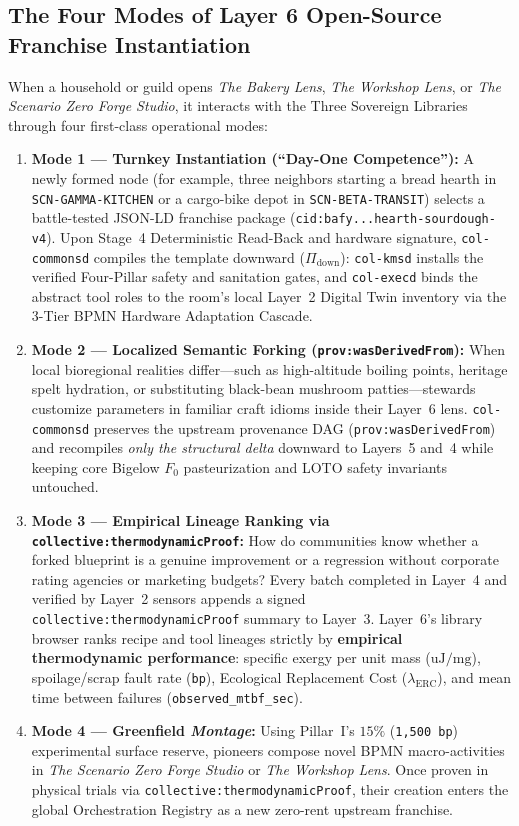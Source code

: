 \subsection{The Four Modes of Layer 6 Open-Source Franchise Instantiation}

When a household or guild opens \textit{The Bakery Lens}, \textit{The Workshop Lens}, or \textit{The Scenario Zero Forge Studio}, it interacts with the Three Sovereign Libraries through four first-class operational modes:
\begin{enumerate}
    \item \textbf{Mode 1 --- Turnkey Instantiation (``Day-One Competence''):} A newly formed node (for example, three neighbors starting a bread hearth in \texttt{SCN-GAMMA-KITCHEN} or a cargo-bike depot in \texttt{SCN-BETA-TRANSIT}) selects a battle-tested JSON-LD franchise package (\texttt{cid:bafy...hearth-sourdough-v4}). Upon Stage~4 Deterministic Read-Back and hardware signature, \texttt{col-commonsd} compiles the template downward ($\Pi_{\mathrm{down}}$): \texttt{col-kmsd} installs the verified Four-Pillar safety and sanitation gates, and \texttt{col-execd} binds the abstract tool roles to the room's local Layer~2 Digital Twin inventory via the 3-Tier BPMN Hardware Adaptation Cascade.
    \item \textbf{Mode 2 --- Localized Semantic Forking (\texttt{prov:wasDerivedFrom}):} When local bioregional realities differ---such as high-altitude boiling points, heritage spelt hydration, or substituting black-bean mushroom patties---stewards customize parameters in familiar craft idioms inside their Layer~6 lens. \texttt{col-commonsd} preserves the upstream provenance DAG (\texttt{prov:wasDerivedFrom}) and recompiles \emph{only the structural delta} downward to Layers~5 and~4 while keeping core Bigelow $F_0$ pasteurization and LOTO safety invariants untouched.
    \item \textbf{Mode 3 --- Empirical Lineage Ranking via \texttt{collective:thermodynamicProof}:} How do communities know whether a forked blueprint is a genuine improvement or a regression without corporate rating agencies or marketing budgets? Every batch completed in Layer~4 and verified by Layer~2 sensors appends a signed \texttt{collective:thermodynamicProof} summary to Layer~3. Layer~6's library browser ranks recipe and tool lineages strictly by \textbf{empirical thermodynamic performance}: specific exergy per unit mass ($\mathrm{uJ/mg}$), spoilage/scrap fault rate (\texttt{bp}), Ecological Replacement Cost ($\lambda_{\mathrm{ERC}}$), and mean time between failures (\texttt{observed\_mtbf\_sec}).
    \item \textbf{Mode 4 --- Greenfield \textit{Montage}:} Using Pillar~I's $15\%$ (\texttt{1,500 bp}) experimental surface reserve, pioneers compose novel BPMN macro-activities in \textit{The Scenario Zero Forge Studio} or \textit{The Workshop Lens}. Once proven in physical trials via \texttt{collective:thermodynamicProof}, their creation enters the global Orchestration Registry as a new zero-rent upstream franchise.
\end{enumerate}

